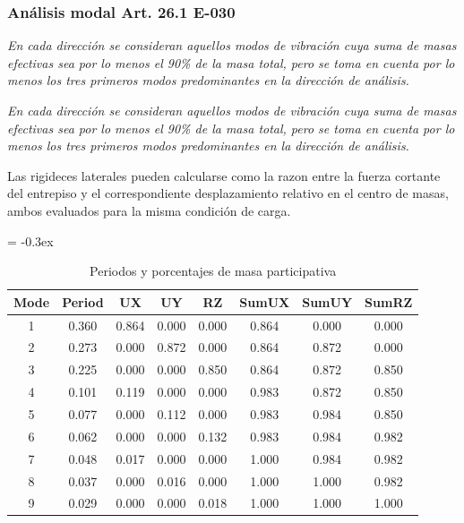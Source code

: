 \documentclass{article}%
\begin{document}
\subsubsection{Análisis modal Art. 26.1 E{-}030}%
\label{ssubsec:AnlisismodalArt.26.1E{-}030}%
\begin{tcolorbox}[colback=gray!5!white,colframe=Maroon!75!black,fonttitle=\bfseries,title=Art. 26.1.1]%
\textit{En cada dirección se consideran aquellos modos de vibración cuya suma de masas efectivas sea por lo menos el 90\% de la masa total, pero se toma en cuenta por lo menos los tres primeros modos predominantes en la dirección de análisis.}%
\end{tcolorbox}%
\begin{tcolorbox}[colback=gray!5!white,colframe=Maroon!75!black,fonttitle=\bfseries,title=Art. 26.1.2]%
\textit{En cada dirección se consideran aquellos modos de vibración cuya suma de masas efectivas sea por lo menos el 90\% de la masa total, pero se toma en cuenta por lo menos los tres primeros modos predominantes en la dirección de análisis.}%
\end{tcolorbox}%
Las rigideces laterales pueden calcularse como la razon entre la fuerza cortante del entrepiso y el correspondiente desplazamiento relativo en el centro de masas, ambos evaluados para la misma condición de carga. \newline%
%


\begin{table}[h!]%
\extrarowheight = -0.3ex%
\renewcommand{\arraystretch}{1.3}%
\centering%
\caption{Periodos y porcentajes de masa participativa}%
\begin{tabular}{cccccccc}
\toprule
Mode & Period & UX & UY & RZ & SumUX & SumUY & SumRZ \\
\midrule
1 & 0.360 & 0.864 & 0.000 & 0.000 & 0.864 & 0.000 & 0.000 \\
2 & 0.273 & 0.000 & 0.872 & 0.000 & 0.864 & 0.872 & 0.000 \\
3 & 0.225 & 0.000 & 0.000 & 0.850 & 0.864 & 0.872 & 0.850 \\
4 & 0.101 & 0.119 & 0.000 & 0.000 & 0.983 & 0.872 & 0.850 \\
5 & 0.077 & 0.000 & 0.112 & 0.000 & 0.983 & 0.984 & 0.850 \\
6 & 0.062 & 0.000 & 0.000 & 0.132 & 0.983 & 0.984 & 0.982 \\
7 & 0.048 & 0.017 & 0.000 & 0.000 & 1.000 & 0.984 & 0.982 \\
8 & 0.037 & 0.000 & 0.016 & 0.000 & 1.000 & 1.000 & 0.982 \\
9 & 0.029 & 0.000 & 0.000 & 0.018 & 1.000 & 1.000 & 1.000 \\
\bottomrule
\end{tabular}
%
\end{table}
\end{document}
